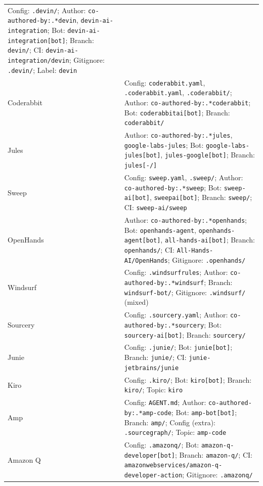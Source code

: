 \documentclass[10pt,a4paper]{article}
\begin{document}
\begin{longtable}{L{2.8cm}L{10.7cm}}
  Config: \texttt{.devin/};
  Author: \texttt{co-authored-by:.*devin}, \texttt{devin-ai-integration};
  Bot: \texttt{devin-ai-integration[bot]};
  Branch: \texttt{devin/};
  CI: \texttt{devin-ai-integration/devin};
  Gitignore: \texttt{.devin/};
  Label: \texttt{devin} \\
Coderabbit &
  Config: \texttt{coderabbit.yaml}, \texttt{.coderabbit.yaml}, \texttt{.coderabbit/};
  Author: \texttt{co-authored-by:.*coderabbit};
  Bot: \texttt{coderabbitai[bot]};
  Branch: \texttt{coderabbit/} \\
Jules &
  Author: \texttt{co-authored-by:.*jules}, \texttt{google-labs-jules};
  Bot: \texttt{google-labs-jules[bot]}, \texttt{jules-google[bot]};
  Branch: \texttt{jules[-/]} \\
Sweep &
  Config: \texttt{sweep.yaml}, \texttt{.sweep/};
  Author: \texttt{co-authored-by:.*sweep};
  Bot: \texttt{sweep-ai[bot]}, \texttt{sweepai[bot]};
  Branch: \texttt{sweep/};
  CI: \texttt{sweep-ai/sweep} \\
OpenHands &
  Author: \texttt{co-authored-by:.*openhands};
  Bot: \texttt{openhands-agent}, \texttt{openhands-agent[bot]}, \texttt{all-hands-ai[bot]};
  Branch: \texttt{openhands/};
  CI: \texttt{All-Hands-AI/OpenHands};
  Gitignore: \texttt{.openhands/} \\
Windsurf &
  Config: \texttt{.windsurfrules};
  Author: \texttt{co-authored-by:.*windsurf};
  Branch: \texttt{windsurf-bot/};
  Gitignore: \texttt{.windsurf/} (mixed) \\
Sourcery &
  Config: \texttt{.sourcery.yaml};
  Author: \texttt{co-authored-by:.*sourcery};
  Bot: \texttt{sourcery-ai[bot]};
  Branch: \texttt{sourcery/} \\
Junie &
  Config: \texttt{.junie/};
  Bot: \texttt{junie[bot]};
  Branch: \texttt{junie/};
  CI: \texttt{junie-jetbrains/junie} \\
Kiro &
  Config: \texttt{.kiro/};
  Bot: \texttt{kiro[bot]};
  Branch: \texttt{kiro/};
  Topic: \texttt{kiro} \\
Amp &
  Config: \texttt{AGENT.md};
  Author: \texttt{co-authored-by:.*amp-code};
  Bot: \texttt{amp-bot[bot]};
  Branch: \texttt{amp/};
  Config (extra): \texttt{.sourcegraph/};
  Topic: \texttt{amp-code} \\
Amazon Q &
  Config: \texttt{.amazonq/};
  Bot: \texttt{amazon-q-developer[bot]};
  Branch: \texttt{amazon-q/};
  CI: \texttt{amazonwebservices/amazon-q-developer-action};
  Gitignore: \texttt{.amazonq/} \\

\end{longtable}
\end{document}
